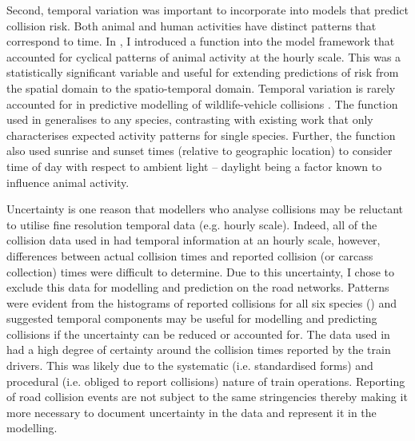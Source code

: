 Second, temporal variation was important to incorporate into models that predict collision risk. Both animal and human activities have distinct patterns that correspond to time. In , I introduced a function into the model framework that accounted for cyclical patterns of animal activity at the hourly scale. This was a statistically significant variable and useful for extending predictions of risk from the spatial domain to the spatio-temporal domain. Temporal variation is rarely accounted for in predictive modelling of wildlife-vehicle collisions \citep[but see][]{beau10,gund98,neum12}. The function used in  generalises to any species, contrasting with existing work that only characterises expected activity patterns for single species. Further, the function also used sunrise and sunset times (relative to geographic location) to consider time of day with respect to ambient light -- daylight being a factor known to influence animal activity.

Uncertainty is one reason that modellers who analyse collisions may be reluctant to utilise fine resolution temporal data (e.g. hourly scale). Indeed, all of the collision data used in  had temporal information at an hourly scale, however, differences between actual collision times and reported collision (or carcass collection) times were difficult to determine. Due to this uncertainty, I chose to exclude this data for modelling and prediction on the road networks. Patterns were evident from the histograms of reported collisions for all six species () and suggested temporal components may be useful for modelling and predicting collisions if the uncertainty can be reduced or accounted for. The data used in  had a high degree of certainty around the collision times reported by the train drivers. This was likely due to the systematic (i.e. standardised forms) and procedural (i.e. obliged to report collisions) nature of train operations. Reporting of road collision events are not subject to the same stringencies thereby making it more necessary to document uncertainty in the data and represent it in the modelling.

